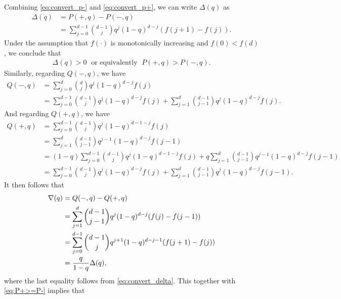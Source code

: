 \documentclass[onecolumn,letterpaper]{IEEEtran}
\newcommand{\cp}{{q}}
\newcommand{\pn}{{P(-,\cp)}}
\newcommand{\pp}{{P(+,\cp)}}
\newcommand{\pgap}{{\Delta(\cp)}}
\newcommand{\pnm}{{Q(-,\cp)}}
\newcommand{\ppm}{{Q(+,\cp)}}
\newcommand{\pgapm}{{\nabla(\cp)}}
\begin{document}
Combining \eqref{eq:convert_p-} and \eqref{eq:convert_p+}, we can write $\pgap$ as
\begin{equation}
\label{eq:convert_delta}
\begin{aligned}
\pgap &= \pp - \pn \\ 
&= \sum\limits_{j=0}^{d-1} \binom{d-1}{j} \cp^j (1-\cp)^{d-j} (f(j+1) - f(j)).
\end{aligned}
\end{equation}
Under the assumption that $f(\cdot)$ is monotonically increasing and $f(0) < f(d)$, we conclude that 
\begin{align}
\label{eq:P+>=P-}
 \pgap > 0 \; \text {  or equivalently  }\;   \pp >  \pn.
\end{align}
Similarly, regarding $\pnm$, we have
\begin{align*}
    \pnm &= \sum\limits_{j=0}^{d} \binom{d}{j} \cp^j (1-\cp)^{d-j} f(j) \\ 
    &= \sum\limits_{j=0}^{d-1} \binom{d-1}{j} \cp^j (1-\cp)^{d-j} f(j) + \sum\limits_{j=1}^{d} \binom{d-1}{j-1} \cp^j (1-\cp)^{d-j} f(j).
\end{align*}
And regarding $\ppm$, we have
\begin{align*}
    \ppm &= \sum\limits_{j=0}^{d-1} \binom{d-1}{j} \cp^j (1-\cp)^{d-1-j} f(j) \\ 
    &= \sum\limits_{j=1}^{d} \binom{d-1}{j-1} \cp^{j-1} (1-\cp)^{d-j} f(j-1) \\ 
    &= (1-\cp) \sum\limits_{j=0}^{d-1} \binom{d-1}{j} \cp^j (1-\cp)^{d-1-j} f(j) + \cp \sum\limits_{j=1}^{d} \binom{d-1}{j-1} \cp^{j-1} (1-\cp)^{d-j} f(j-1) \\
    &= \sum\limits_{j=0}^{d-1} \binom{d-1}{j} \cp^j (1-\cp)^{d-j} f(j) + \sum\limits_{j=1}^{d} \binom{d-1}{j-1} \cp^j (1-\cp)^{d-j} f(j-1).
\end{align*}
It then follows that 
\begin{align} 
\label{eq:Opposite-Delta>0}
    \pgapm &=\pnm-\ppm \\
    & =\sum\limits_{j=1}^{d} \binom{d-1}{j-1} \cp^j (1-\cp)^{d-j} (f(j)-f(j-1)) \notag \\ 
    &= \sum\limits_{j=0}^{d-1} \binom{d-1}{j} \cp^{j+1} (1-\cp)^{d-j-1} (f(j+1)-f(j)) \notag\\ 
    &= \frac{\cp}{1-\cp} \pgap,
\end{align}
where the last equality follows from \eqref{eq:convert_delta}. This together with \eqref{eq:P+>=P-} implies that 
\end{document}
